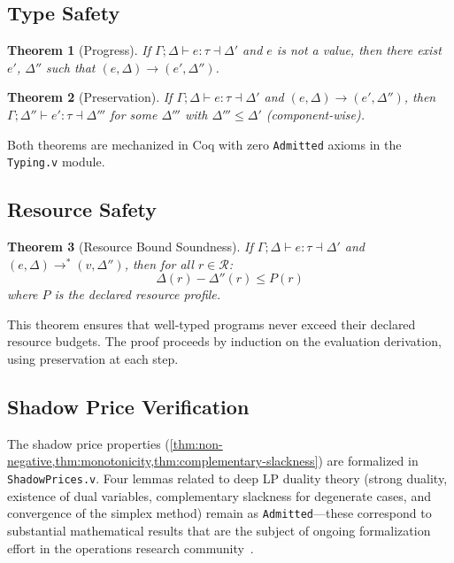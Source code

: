 \documentclass[11pt,a4paper]{article}
\newtheorem{theorem}{Theorem}[section]
\begin{document}
\subsection{Type Safety}

\begin{theorem}[Progress]
If $\Gamma; \Delta \vdash e : \tau \dashv \Delta'$ and $e$ is not a value,
then there exist $e'$, $\Delta''$ such that
$(e, \Delta) \longrightarrow (e', \Delta'')$.
\end{theorem}

\begin{theorem}[Preservation]
If $\Gamma; \Delta \vdash e : \tau \dashv \Delta'$ and
$(e, \Delta) \longrightarrow (e', \Delta'')$, then
$\Gamma; \Delta'' \vdash e' : \tau \dashv \Delta'''$ for some $\Delta'''$
with $\Delta''' \leq \Delta'$ (component-wise).
\end{theorem}

Both theorems are mechanized in Coq with zero \texttt{Admitted} axioms in the
\texttt{Typing.v} module.

\subsection{Resource Safety}

\begin{theorem}[Resource Bound Soundness]
\label{thm:resource-safety}
If $\Gamma; \Delta \vdash e : \tau \dashv \Delta'$ and
$(e, \Delta) \longrightarrow^* (v, \Delta'')$, then for all
$r \in \mathcal{R}$:
\[
  \Delta(r) - \Delta''(r) \leq P(r)
\]
where $P$ is the declared resource profile.
\end{theorem}

This theorem ensures that well-typed programs never exceed their declared
resource budgets.  The proof proceeds by induction on the evaluation derivation,
using preservation at each step.

\subsection{Shadow Price Verification}

The shadow price properties (\cref{thm:non-negative,thm:monotonicity,thm:complementary-slackness})
are formalized in \texttt{ShadowPrices.v}.  Four lemmas related to deep LP
duality theory (strong duality, existence of dual variables, complementary
slackness for degenerate cases, and convergence of the simplex method) remain
as \texttt{Admitted}---these correspond to substantial mathematical results
that are the subject of ongoing formalization effort in the operations research
community~\cite{allamigeon2018}.
\end{document}
